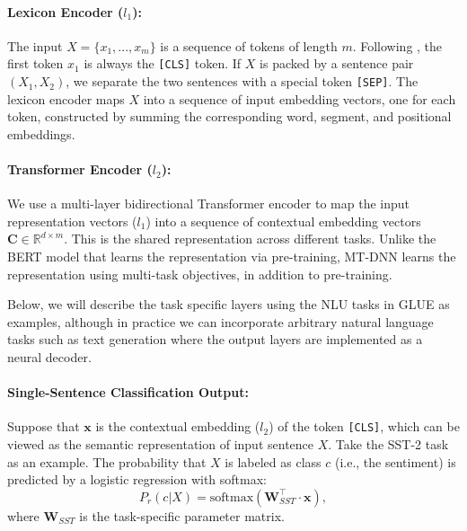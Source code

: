 \paragraph{Lexicon Encoder ($l_1$):} 
The input $X=\{x_1,...,x_m\}$ is a sequence of tokens of length $m$. Following \citet{bert2018}, the first token $x_1$ is always the \texttt{[CLS]} token. 
If $X$ is packed by a sentence pair $(X_1, X_2)$, we separate the two sentences with a special token \texttt{[SEP]}. The lexicon encoder maps $X$ into a sequence of input embedding vectors, one for each token, constructed by summing the corresponding word, segment, and positional embeddings.

\paragraph{Transformer Encoder ($l_2$):}
We use a multi-layer bidirectional Transformer encoder \citep{vaswani2017attention} to map the input representation vectors ($l_1$) into a sequence of contextual embedding vectors 
$\mathbf{C} \in \mathbb{R}^{d \times m}$. 
This is the shared representation across different tasks. Unlike the BERT model \citep{bert2018} that learns the representation via pre-training,
MT-DNN learns the representation using multi-task objectives, in addition to pre-training.

Below, we will describe the task specific layers using the NLU tasks in GLUE as examples, although in practice we can incorporate arbitrary natural language tasks such as text generation where the output layers are implemented as a neural decoder.

\paragraph{Single-Sentence Classification Output:}
Suppose that $\mathbf{x}$ is the contextual embedding ($l_2$) of the token \texttt{[CLS]}, which can be viewed as the semantic representation of input sentence $X$. Take the SST-2 task as an example. The probability that $X$ is labeled as class $c$ (i.e., the sentiment) is predicted by a logistic regression with softmax:
\begin{equation}
P_r(c|X)= \text{softmax} (\mathbf{W}_{SST}^\top \cdot \mathbf{x}),
\label{eqn:single-sent-classification}
\end{equation}
where $\mathbf{W}_{SST}$ is the task-specific parameter matrix.

